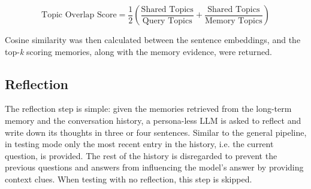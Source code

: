 \[
\text{Topic Overlap Score} = \frac{1}{2} ( \frac{\text{Shared Topics}}{\text{Query Topics}} + \frac{\text{Shared Topics}}{\text{Memory Topics}} )
\]

\noindent Cosine similarity was then calculated between the sentence embeddings, and the top-\textit{k} scoring memories, along with the memory evidence, were returned.



\subsection{Reflection}

The reflection step is simple: given the memories retrieved from the long-term memory and the conversation history, a persona-less LLM is asked to reflect and write down its thoughts in three or four sentences. Similar to the general pipeline, in testing mode only the most recent entry in the history, i.e. the current question, is provided. The rest of the history is disregarded to prevent the previous questions and answers from influencing the model's answer by providing context clues. When testing with no reflection, this step is skipped.













